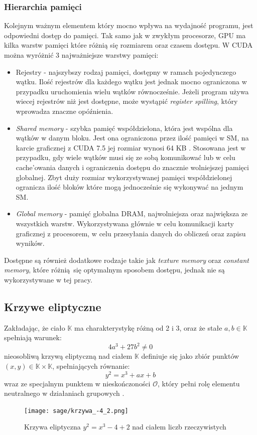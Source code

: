 \subsubsection{Hierarchia pamięci}
Kolejnym ważnym elementem który mocno wpływa na wydajność
programu, jest odpowiedni dostęp do pamięci.
Tak samo jak w zwykłym procesorze, GPU ma kilka warstw
pamięci które różnią się rozmiarem oraz czasem dostępu.
W CUDA można wyróżnić 3 najważniejsze warstwy pamięci:
\begin{itemize}
    \item Rejestry - najszybszy rodzaj pamięci, dostępny w ramach pojedynczego wątku.
          Ilość rejestrów dla każdego wątku jest jednak mocno ograniczona w przypadku
          uruchomienia wielu wątków równocześnie. Jeżeli program używa wiecej rejestrów niż jest dostępne,
          może wystąpić \textit{register spilling}, który wprowadza znaczne opóźnienia.
    \item \textit{Shared memory} - szybka pamięć współdzielona, która jest wspólna dla wątków w danym bloku. Jest ona ograniczona
          przez ilość pamięci w SM, na karcie graficznej z CUDA 7.5 jej rozmiar wynosi 64 KB \cite{CudaDeveloper}.
          Stosowana jest w przypadku, gdy wiele wątków musi się ze sobą komunikować lub w celu cache'owania danych
          i ograniczenia dostępu do znacznie wolniejszej pamięci globalnej.
          Zbyt duży rozmiar wykorzystywanej pamięci współdzielonej ogranicza ilość bloków które mogą jednocześnie się
          wykonywać na jednym SM.
    \item \textit{Global memory} - pamięć globalna DRAM, najwolniejsza oraz największa ze wszystkich warstw. Wykorzystywana głównie w celu
          komunikacji karty graficznej z procesorem, w celu przesyłania danych do obliczeń oraz zapisu wyników.
\end{itemize}
Dostępne są również dodatkowe rodzaje takie jak \textit{texture memory} oraz \textit{constant memory},
które różnią się optymalnym sposobem dostępu, jednak nie są wykorzystywane w tej pracy.

\subsection{Krzywe eliptyczne}
Zakładając, że ciało $\mathbb{K}$ ma charakterystykę różną od 2 i 3,
oraz że stałe $a, b \in \mathbb{K}$ spełniają warunek:
\[4a^3 + 27b^2 \neq 0\]
nieosobliwą krzywą eliptyczną nad ciałem $\mathbb{K}$ definiuje się jako zbiór punktów $(x,y) \in \mathbb{K} \times \mathbb{K}$,
spełniających równanie:
\[y^2 = x^3 + ax + b\]
wraz ze specjalnym punktem w nieskończoności $\mathcal{O}$, który pełni rolę elementu neutralnego
w działaniach grupowych
\cite{Stinson2021}.
\begin{figure}[H]
    \centering \texttt{[image: sage/krzywa\_-4\_2.png]}
    \caption{Krzywa eliptyczna $y^2=x^3-4+2$ nad ciałem liczb rzeczywistych}
\end{figure}

